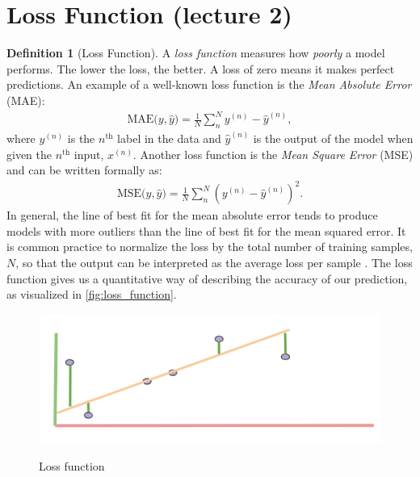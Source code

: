 \documentclass[11pt]{article}
\numberwithin{equation}{section}
\theoremstyle{definition}%
\newtheorem{definition}{Definition}[section]%
\begin{document}
\section{Loss Function (lecture 2)}
\begin{definition}[Loss Function]
A \emph{loss function} measures how \emph{poorly} a model performs. The lower the loss, the better. A loss of zero means it makes perfect predictions. An example of a well-known loss function is the \emph{Mean Absolute Error} (MAE):
\begin{align}
    \text{MAE($y, \hat{y}$)} = \frac{1}{N}\sum_{n}^{N}{y^{(n)} - \hat{y}^{(n)}},
\end{align}
where $y^{(n)}$ is the $n^{\text{th}}$ label in the data and $\hat{y}^{(n)}$ is the output of the model when given the $n^{\text{th}}$ input, $x^{(n)}$. Another loss function is the \emph{Mean Square Error} (MSE) and can be written formally as:
\begin{align}
    \text{MSE($y, \hat{y}$)} = \frac{1}{N}\sum_{n}^{N}{(y^{(n)} - \hat{y}^{(n)})^2}.
\end{align}
In general, the line of best fit for the mean absolute error tends to produce models with more outliers than the line of best fit for the mean squared error. It is common practice to normalize the loss by the total number of training samples, $N$, so that the output can be interpreted as the average loss per sample \cite{Cornell}. The loss function gives us a quantitative way of describing the accuracy of our prediction, as visualized in \autoref{fig:loss_function}.
\end{definition}

\begin{figure}[h]%
    \centering
    {\includegraphics[width=0.5\linewidth]{./Figs/loss_function.png} }
    \caption{Loss function}%
    \label{fig:loss_function}%
\end{figure}
\end{document}
